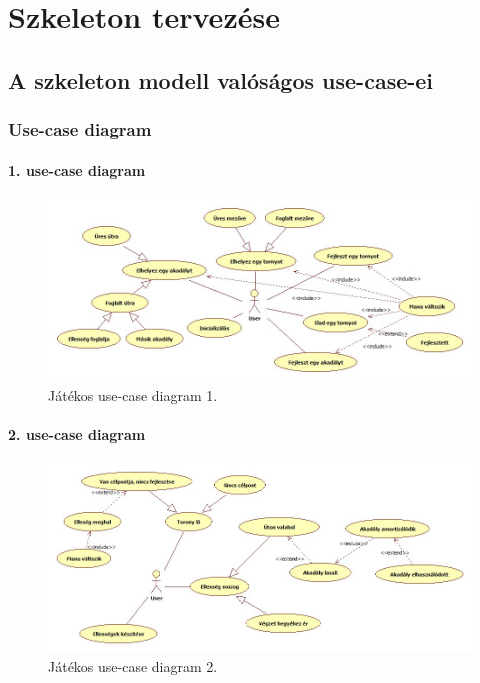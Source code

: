 %
\chapter{Szkeleton tervezése}

\thispagestyle{fancy}

\section{A szkeleton modell valóságos use-case-ei}

\subsection{Use-case diagram}

\subsubsection{1. use-case diagram}
\begin{figure}[H]
\begin{center}
\includegraphics[width=17cm]{chapters/chapter05/images/user_uc_1.jpg}
\caption{Játékos use-case diagram 1.}
\label{fig:SzkeletonUseCase1}
\end{center}
\end{figure}


\subsubsection{2. use-case diagram}
\begin{figure}[H]
\begin{center}
\includegraphics[width=17cm]{chapters/chapter05/images/user_uc_2.jpg}
\caption{Játékos use-case diagram 2.}
\label{fig:SzkeletonUseCase1}
\end{center}
\end{figure}

